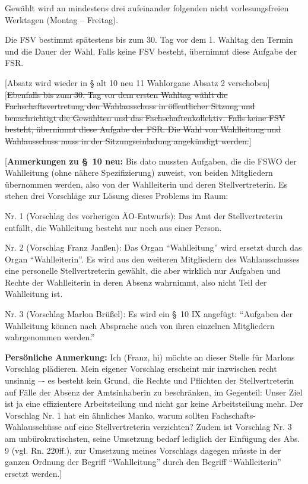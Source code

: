 \documentclass[%
draft,%
multilinesections%
]{fswo}
\newcommand\oldT[1]  {{\color{Gray}[\st{#1}]}}
\newcommand\bemFr[1] {{\color{Red}[#1]}}
\newcommand\bemTi[1] {{\color{Cyan}[#1]}} %
\newcommand\oldT[1]{}%
\newcommand\bemFr[1]{}%
\newcommand\bemTi[1]{}%
\begin{document}
\begin{contract}
Gewählt wird an mindestens drei aufeinander folgenden nicht vorlesungsfreien Werktagen (Montag -- Freitag).

Die FSV bestimmt spätestens bis zum 30. Tag vor dem 1. Wahltag den Termin und die Dauer der Wahl.
Falls keine FSV besteht, übernimmt diese Aufgabe der FSR.


\bemTi{Absatz wird wieder in § alt 10 neu 11 Wahlorgane Absatz 2 verschoben}
\oldT{Ebenfalls bis zum 30. Tag vor dem ersten Wahltag wählt die Fachschaftsvertretung den Wahlausschuss in öffentlicher Sitzung und benachrichtigt die Gewählten und das Fachschaftenkollektiv.
Falls keine FSV besteht, übernimmt diese Aufgabe der FSR.
Die Wahl von Wahlleitung und Wahlausschuss muss in der Sitzungseinladung angekündigt werden.}
\end{contract}

\bemFr{\textbf{Anmerkungen zu \S~10 neu:}
Bis dato mussten Aufgaben, die die FSWO der Wahlleitung (ohne nähere Spezifizierung) zuweist, von beiden Mitgliedern übernommen werden, also von der Wahlleiterin und deren Stellvertreterin.
Es stehen drei Vorschläge zur Lösung dieses Problems im Raum:

Nr. 1 (Vorschlag des vorherigen ÄO-Entwurfs):
Das Amt der Stellvertreterin entfällt, die Wahlleitung besteht nur noch aus einer Person.

Nr. 2 (Vorschlag Franz Janßen):
Das Organ \enquote{Wahlleitung} wird ersetzt durch das Organ \enquote{Wahlleiterin}.
Es wird aus den weiteren Mitgliedern des Wahlausschusses eine personelle Stellvertreterin gewählt,
die aber wirklich nur Aufgaben und Rechte der Wahlleiterin in deren Absenz wahrnimmt, also nicht Teil der Wahlleitung ist.

Nr. 3 (Vorschlag Marlon Brüßel):
Es wird ein \S~10 IX angefügt: \enquote{Aufgaben der Wahlleitung können nach Absprache auch von ihren einzelnen Mitgliedern wahrgenommen werden.}

\textbf{Persönliche Anmerkung:} Ich (Franz, hi) möchte an dieser Stelle für Marlons Vorschlag plädieren.
Mein eigener Vorschlag erscheint mir inzwischen recht unsinnig –- es besteht kein Grund,
die Rechte und Pflichten der Stellvertreterin auf Fälle der Absenz der Amtsinhaberin zu beschränken, im Gegenteil:
Unser Ziel ist ja eine effizientere Arbeitsteilung und nicht gar keine Arbeitsteilung mehr.
Der Vorschlag Nr. 1 hat ein ähnliches Manko, warum sollten Fachschafts-Wahlausschüsse auf eine Stellvertreterin verzichten?
Zudem ist Vorschlag Nr. 3 am unbürokratischsten, seine Umsetzung bedarf lediglich der Einfügung des Abs. 9 (vgl. Rn. 220ff.),
zur Umsetzung meines Vorschlags dagegen müsste in der ganzen Ordnung der Begriff \enquote{Wahlleitung} durch den Begriff \enquote{Wahlleiterin} ersetzt werden.}
\end{document}
